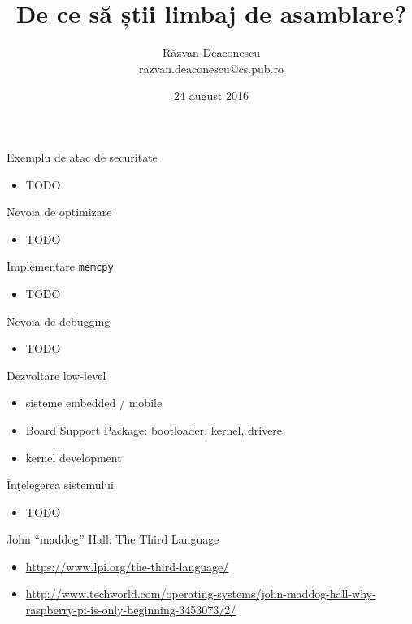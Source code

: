 \documentclass{beamer}
\title[De ce asm?]{De ce să știi limbaj de asamblare?}
\institute{Informatica la Castel 2016 (Macea, Arad)}
\author[Răzvan Deaconescu]{Răzvan Deaconescu \\
razvan.deaconescu@cs.pub.ro}
\date{24 august 2016}
\begin{document}
\frame{\titlepage}

\begin{frame}{Exemplu de atac de securitate}
  \begin{itemize}
    \item TODO
  \end{itemize}
\end{frame}

\begin{frame}{Nevoia de optimizare}
  \begin{itemize}
    \item TODO
  \end{itemize}
\end{frame}

\begin{frame}{Implementare \texttt{memcpy}}
  \begin{itemize}
    \item TODO
  \end{itemize}
\end{frame}

\begin{frame}{Nevoia de debugging}
  \begin{itemize}
    \item TODO
  \end{itemize}
\end{frame}

\begin{frame}{Dezvoltare low-level}
  \begin{itemize}
    \pause \item sisteme embedded / mobile
    \pause \item Board Support Package: bootloader, kernel, drivere
    \pause \item kernel development
  \end{itemize}
\end{frame}

\begin{frame}{Înțelegerea sistemului}
  \begin{itemize}
    \item TODO
  \end{itemize}
\end{frame}

\begin{frame}{John ``maddog'' Hall: The Third Language}
  \begin{itemize}
    \item \url{https://www.lpi.org/the-third-language/}
    \item \url{http://www.techworld.com/operating-systems/john-maddog-hall-why-raspberry-pi-is-only-beginning-3453073/2/}
  \end{itemize}
\end{frame}
\end{document}
